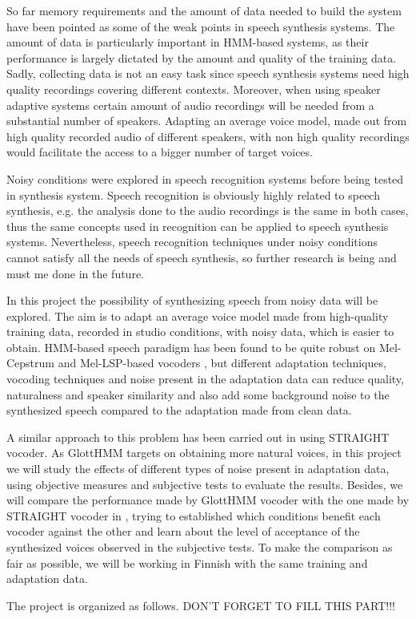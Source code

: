 So far memory requirements and the amount of data needed to build the system have been pointed as some of the weak points in speech synthesis systems. The amount of data is particularly important in HMM-based systems, as their performance is largely dictated by the amount and quality of the training data. Sadly, collecting data is not an easy task since speech synthesis systems need high quality recordings covering different contexts. Moreover, when using speaker adaptive systems certain amount of audio recordings will be needed from a substantial number of speakers. Adapting an average voice model, made out from high quality recorded audio of different speakers, with non high quality recordings would facilitate the access to a bigger number of target voices.

Noisy conditions were explored in speech recognition systems before being tested in synthesis system. Speech recognition is obviously highly related to speech synthesis, e.g. the analysis done to the audio recordings is the same in both cases, thus the same concepts used in recognition can be applied to speech synthesis systems. Nevertheless, speech recognition techniques under noisy conditions cannot satisfy all the needs of speech synthesis, so further research is being and must me done in the future.

In this project the possibility of synthesizing speech from noisy data will be explored. The aim is to adapt an average voice model made from high-quality training data, recorded in studio conditions, with noisy data, which is easier to obtain. HMM-based speech paradigm has been found to be quite robust on Mel-Cepstrum \cite{karhila_jstsp_14, yamagishi2008robustness} and Mel-LSP-based vocoders \cite{Yanagisawa_SSW8}, but different adaptation techniques, vocoding techniques and noise present in the adaptation data can reduce quality, naturalness and speaker similarity and also add some background noise to the synthesized speech compared to the adaptation made from clean data. 

A similar approach to this problem has been carried out in \cite{karhila_jstsp_14} using STRAIGHT vocoder. As GlottHMM targets on obtaining more natural voices, in this project we will study the effects of different types of noise present in adaptation data, using objective measures and subjective tests to evaluate the results. Besides, we will compare the performance made by GlottHMM vocoder with the one made by STRAIGHT vocoder in \cite{karhila_jstsp_14}, trying to established which conditions benefit each vocoder against the other and learn about the level of acceptance of the synthesized voices observed in the subjective tests. To make the comparison as fair as possible, we will be working in Finnish with the same training and adaptation data.

The project is organized as follows. DON'T FORGET TO FILL THIS PART!!!

